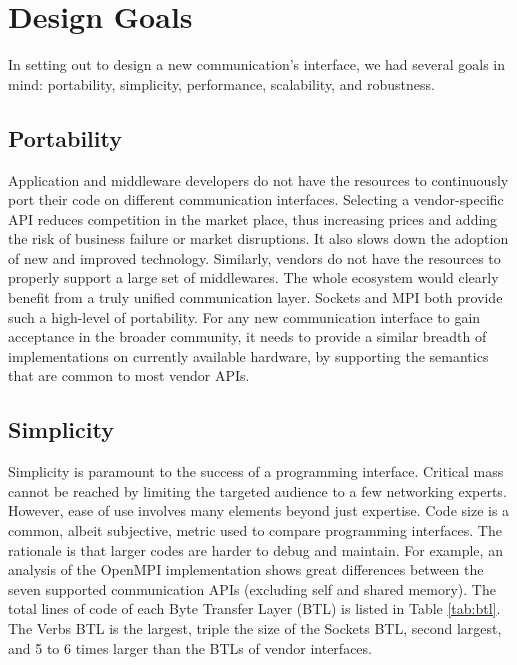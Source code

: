 \section{Design Goals}
In setting out to design a new communication's interface, we had several goals 
in mind: portability, simplicity, performance, scalability, and robustness.

\subsection{Portability}
Application and middleware developers do not have the resources to continuously 
port their code on different communication interfaces. 
Selecting a vendor-specific API reduces competition in the market place, thus 
increasing prices and adding the risk of business failure or market disruptions. It 
also slows down the adoption of new and improved technology. 
Similarly, vendors do not have the resources to properly support a large set 
of middlewares. The whole ecosystem would clearly benefit from a truly unified 
communication layer. 
Sockets and MPI both provide such a high-level of portability. 
For any new communication interface to gain acceptance in the broader 
community, it needs to provide a similar breadth of implementations on 
currently available hardware, by supporting the semantics that are common 
to most vendor APIs.

\subsection{Simplicity}
Simplicity is paramount to the success of a programming interface. Critical 
mass cannot be reached by limiting the targeted audience to a few networking 
experts. However, ease of use involves many elements beyond just expertise. 
Code size is a common, albeit subjective, metric used to compare programming 
interfaces. The rationale is that larger codes are harder to debug and 
maintain. For example, an analysis of the OpenMPI implementation shows great 
differences between the seven supported communication APIs (excluding self and 
shared memory). The total lines of code of each Byte Transfer Layer (BTL) is 
listed in Table \ref{tab:btl}. The Verbs BTL is the largest, triple the size 
of the Sockets BTL, second largest, and 5 to 6 times larger than the BTLs of 
vendor interfaces. 

